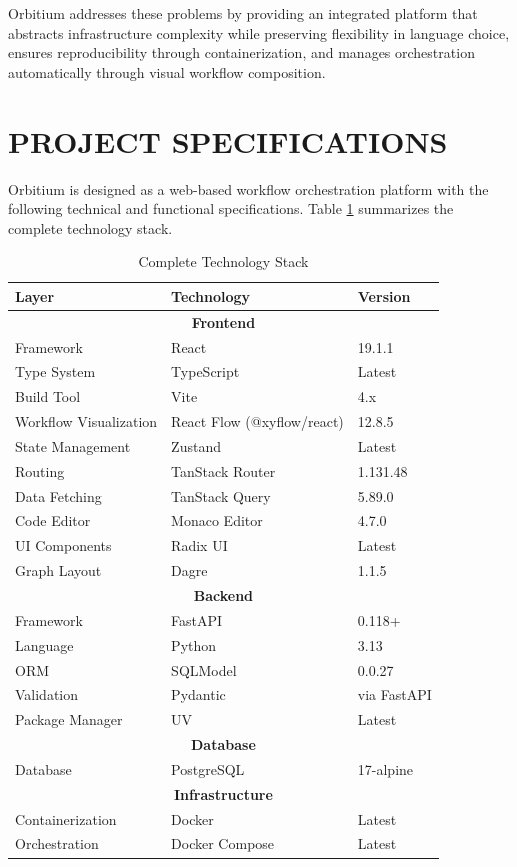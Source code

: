 \documentclass[12pt]{article}
\begin{document}
Orbitium addresses these problems by providing an integrated platform that abstracts infrastructure complexity while preserving flexibility in language choice, ensures reproducibility through containerization, and manages orchestration automatically through visual workflow composition.

\newpage
\section{PROJECT SPECIFICATIONS}

Orbitium is designed as a web-based workflow orchestration platform with the following technical and functional specifications. Table \ref{tab:tech_stack} summarizes the complete technology stack.

\begin{table}[h]
\centering
\caption{Complete Technology Stack}
\label{tab:tech_stack}
\begin{tabular}{|l|l|l|}
\hline
\textbf{Layer} & \textbf{Technology} & \textbf{Version} \\
\hline
\multicolumn{3}{|c|}{\textbf{Frontend}} \\
\hline
Framework & React & 19.1.1 \\
Type System & TypeScript & Latest \\
Build Tool & Vite & 4.x \\
Workflow Visualization & React Flow (@xyflow/react) & 12.8.5 \\
State Management & Zustand & Latest \\
Routing & TanStack Router & 1.131.48 \\
Data Fetching & TanStack Query & 5.89.0 \\
Code Editor & Monaco Editor & 4.7.0 \\
UI Components & Radix UI & Latest \\
Graph Layout & Dagre & 1.1.5 \\
\hline
\multicolumn{3}{|c|}{\textbf{Backend}} \\
\hline
Framework & FastAPI & 0.118+ \\
Language & Python & 3.13 \\
ORM & SQLModel & 0.0.27 \\
Validation & Pydantic & via FastAPI \\
Package Manager & UV & Latest \\
\hline
\multicolumn{3}{|c|}{\textbf{Database}} \\
\hline
Database & PostgreSQL & 17-alpine \\
\hline
\multicolumn{3}{|c|}{\textbf{Infrastructure}} \\
\hline
Containerization & Docker & Latest \\
Orchestration & Docker Compose & Latest \\
\hline
\end{tabular}
\end{table}
\end{document}
